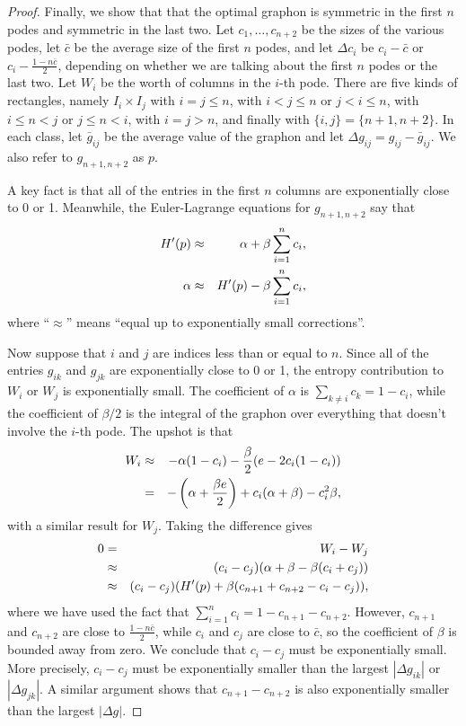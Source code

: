 \documentclass[12pt]{amsart}
\newcommand{\Value}{worth}
\begin{document}
{\begin{proof}
Finally, we show that that the optimal graphon is symmetric in the first $n$ podes and symmetric in the 
last two. Let $c_1, \ldots, c_{n+2}$ be the sizes of the various podes, let $\bar c$ be the average 
size of the first $n$ podes, and let $\Delta c_i$ be $c_i-\bar c$ or $c_i - \frac{1-n\bar c}{2}$, depending
on whether we are talking about the first $n$ podes or the last two. Let 
$W_i$ be the \Value{} of columns in the $i$-th pode. There are five kinds of rectangles, namely 
$I_i \times I_j$ with $i=j \le n$, with $i < j \le n$ or $j<i \le n$, with $i \le n < j$ or 
$j \le n < i$, with $i=j >n$, and finally with $\{i,j\} = \{n+1,n+2\}$. In each class, let $\bar g_{ij}$
be the average value of the graphon and let $\Delta g_{ij} = g_{ij} - \bar g_{ij}$. We also refer to 
$g_{n+1,n+2}$ as $p$.

A key fact is that all of the entries in the first $n$ columns are exponentially close to 0 or 1. Meanwhile,
the Euler-Lagrange equations for $g_{n+1,n+2}$ say that 
\begin{eqnarray} 
H'(p) & \approx & \alpha + \beta \sum_{i=1}^n c_i,  \cr 
\alpha & \approx  & H'(p) - \beta \sum_{i=1}^n c_i,
\end{eqnarray}
where ``$\approx$'' means ``equal up to exponentially small corrections''. 

Now suppose that $i$ and $j$ are indices less than or equal to $n$. Since all of the entries $g_{ik}$ 
and $g_{jk}$ are exponentially close to 0 or 1, the entropy contribution to $W_i$ or $W_j$ is 
exponentially small. The coefficient of $\alpha$ is $\sum_{k \ne i} c_k = 1-c_i$, while the coefficient
of $\beta/2$ is the integral of the graphon over everything that doesn't involve the $i$-th pode. The
upshot is that 
\begin{eqnarray} 
W_i & \approx & -\alpha(1-c_i) - \frac{\beta}{2} (e - 2 c_i(1-c_i)) \cr 
& = & - \left ( \alpha + \frac{\beta e}{2} \right ) + c_i(\alpha + \beta) - c_i^2 \beta,
\end{eqnarray}
with a similar result for $W_j$. Taking the difference gives 
\begin{eqnarray} 
0 & = & W_i - W_j \cr 
& \approx & (c_i-c_j) (\alpha + \beta - \beta(c_i+c_j)) \cr 
& \approx & (c_i-c_j) (H'(p) + \beta(c_{n+1}+c_{n+2}-c_i-c_j)),
\end{eqnarray}
where we have used the fact that $\sum_{i=1}^n c_i = 1-c_{n+1}-c_{n+2}$. 
However, $c_{n+1}$ and $c_{n+2}$ are close to $\frac{1-n\bar c}{2}$, while $c_i$ and $c_j$ are close
to $\bar c$, so the coefficient of $\beta$ is bounded away from zero. We conclude 
that $c_i-c_j$ must be exponentially small. More precisely, $c_i - c_j$ must be exponentially smaller than
the largest $|\Delta g_{ik}|$ or $|\Delta g_{jk}|$. A similar argument shows that $c_{n+1}-c_{n+2}$ is
also exponentially smaller than the largest $|\Delta g|$.


\end{proof}}
\end{document}
